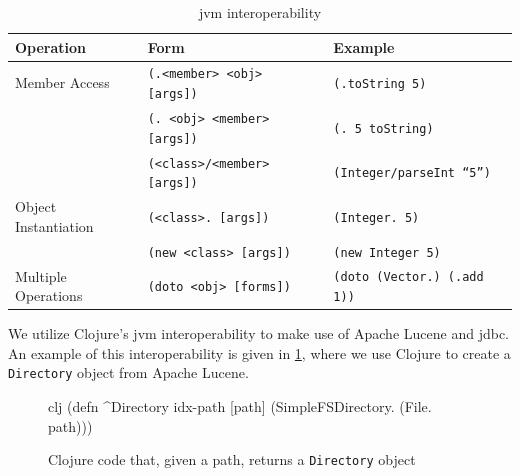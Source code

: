 			\begin{table}
				\centering
				
				\begin{tabular}{lll}
					\toprule
					Operation & Form & Example \\
					\midrule
					Member Access & \texttt{(.<member> <obj> [args])} & \texttt{(.toString 5)} \\
					 & \texttt{(. <obj> <member> [args])} & \texttt{(. 5 toString)} \\
					 & \texttt{(<class>/<member> [args])} & \texttt{(Integer/parseInt ``5'')} \\
					Object Instantiation & \texttt{(<class>. [args])} & \texttt{(Integer. 5)} \\
					 & \texttt{(new <class> [args])} & \texttt{(new Integer 5)} \\
					Multiple Operations & \texttt{(doto <obj> [forms])} & \texttt{(doto (Vector.) (.add 1))} \\
					\bottomrule
				\end{tabular}
				
				\caption{\gls{jvm} interoperability}
				\label{tbl:jvm-interop-syntax}
			\end{table}
			
			We utilize Clojure's \gls{jvm} interoperability to make use of Apache Lucene and \gls{jdbc}.  An example of this interoperability is given in \cref{fig:clojure-directory-object}, where we use Clojure to create a \texttt{Directory} object from Apache Lucene.
			
			\begin{figure}
				\begin{singlespaced}
					\begin{pygments}{clj}
(defn ^Directory idx-path
  [path]
  (SimpleFSDirectory. (File. path)))
					\end{pygments}
				\end{singlespaced}
				
				\caption{Clojure code that, given a path, returns a \texttt{Directory} object}
				\label{fig:clojure-directory-object}
			\end{figure}